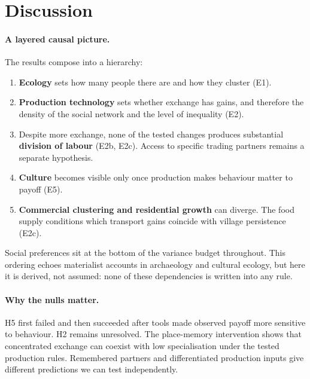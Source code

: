 \documentclass[11pt]{article}
\theoremstyle{definition}
\newcommand{\1}{\mathbf{1}}
\begin{document}
\section{Discussion}

\paragraph{A layered causal picture.} The results compose into a hierarchy:
\begin{enumerate}
\item \textbf{Ecology} sets how many people there are and how they cluster (E1).
\item \textbf{Production technology} sets whether exchange has gains, and therefore the density of the social network and the level of inequality (E2).
\item Despite more exchange, none of the tested changes produces substantial \textbf{division of labour} (E2b, E2c). Access to specific trading partners remains a separate hypothesis.
\item \textbf{Culture} becomes visible only once production makes behaviour matter to payoff (E5).
\item \textbf{Commercial clustering and residential growth} can diverge. The food supply conditions which transport gains coincide with village persistence (E2c).
\end{enumerate}
Social preferences sit at the bottom of the variance budget throughout. This ordering echoes materialist accounts in archaeology and cultural ecology, but here it is derived, not assumed: none of these dependencies is written into any rule.

\paragraph{Why the nulls matter.} H5 first failed and then succeeded after tools made observed payoff more sensitive to behaviour. H2 remains unresolved. The place-memory intervention shows that concentrated exchange can coexist with low specialisation under the tested production rules. Remembered partners and differentiated production inputs give different predictions we can test independently.
\end{document}
